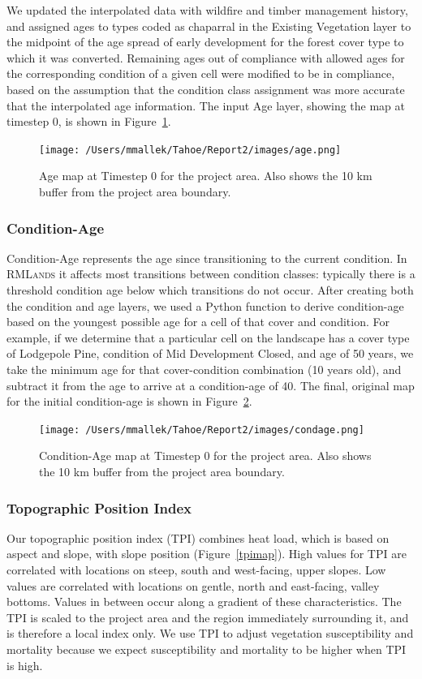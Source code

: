 We updated the interpolated data with wildfire and timber management history, and assigned ages to types coded as chaparral in the Existing Vegetation layer to the midpoint of the age spread of early development for the forest cover type to which it was converted. Remaining ages out of compliance with allowed ages for the corresponding condition of a given cell were modified to be in compliance, based on the assumption that the condition class assignment was more accurate that the interpolated age information. The input Age layer, showing the map at timestep 0, is shown in Figure~\ref{agemap}.

\begin{figure}[htbp]
\centering
\texttt{[image: /Users/mmallek/Tahoe/Report2/images/age.png]}
\caption{Age map at Timestep 0 for the project area. Also shows the 10 km buffer from the project area boundary.} 
\label{agemap}
\end{figure}

\subsubsection{Condition-Age}
Condition-Age represents the age since transitioning to the current condition. In \textsc{RMLands} it affects most transitions between condition classes: typically there is a threshold condition age below which transitions do not occur. After creating both the condition and age layers, we used a Python function to derive condition-age based on the youngest possible age for a cell of that cover and condition. For example, if we determine that a particular cell on the landscape has a cover type of Lodgepole Pine, condition of Mid Development Closed, and age of 50 years, we take the minimum age for that cover-condition combination (10 years old), and subtract it from the age to arrive at a condition-age of 40. The final, original map for the initial condition-age is shown in Figure~\ref{condagemap}.

\begin{figure}[htbp]
\centering
\texttt{[image: /Users/mmallek/Tahoe/Report2/images/condage.png]}
\caption{Condition-Age map at Timestep 0 for the project area. Also shows the 10 km buffer from the project area boundary.} 
\label{condagemap}
\end{figure}

\subsubsection{Topographic Position Index}
Our topographic position index (TPI) combines heat load, which is based on aspect and slope, with slope position (Figure~\ref{tpimap}). High values for TPI are correlated with locations on steep, south and west-facing, upper slopes. Low values are correlated with locations on gentle, north and east-facing, valley bottoms. Values in between occur along a gradient of these characteristics. The TPI is scaled to the project area and the region immediately surrounding it, and is therefore a local index only. We use TPI to adjust vegetation susceptibility and mortality because we expect susceptibility and mortality to be higher when TPI is high.

